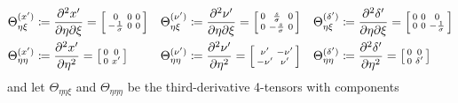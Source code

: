 \documentclass{article}
\begin{document}
\begin{align}
  \Theta_{\eta\xi}^{(x')}                                                                                                  & \coloneqq \frac{\partial^2 x'}{\partial \eta \partial \xi} = \begin{bsmallmatrix} 0 & 0 & 0 \\ -\frac{1}{\sigma} & 0 & 0 \end{bsmallmatrix} &   &
  \Theta_{\eta\xi}^{(\nu')} \coloneqq \frac{\partial^2 \nu'}{\partial \eta \partial \xi} = \begin{bsmallmatrix} 0 & \frac{s}{\sigma} & 0 \\ 0 & -\frac{s}{\sigma} & 0 \end{bsmallmatrix} &                                                                                              &
  \Theta_{\eta\xi}^{(\delta')} \coloneqq \frac{\partial^2 \delta'}{\partial \eta \partial \xi} = \begin{bsmallmatrix} 0 & 0 & 0 \\ 0 & 0 & -\frac{1}{\sigma} \end{bsmallmatrix}                                                                                                \\
  \Theta_{\eta\eta}^{(x')}                                                                                                 & \coloneqq \frac{\partial^2 x'}{\partial \eta^2} = \begin{bsmallmatrix} 0 & 0 \\ 0 & x' \end{bsmallmatrix}            &   &
  \Theta_{\eta\eta}^{(\nu')} \coloneqq \frac{\partial^2 \nu'}{\partial \eta^2} = \begin{bsmallmatrix} \nu' & -\nu' \\ -\nu' & \nu' \end{bsmallmatrix}           &                                                                                              &
  \Theta_{\eta\eta}^{(\delta')} \coloneqq \frac{\partial^2 \delta'}{\partial \eta^2} = \begin{bsmallmatrix} 0 & 0 \\ 0 & \delta' \end{bsmallmatrix}
\end{align}
%
and let $\Theta_{\eta\eta\xi}$ and $\Theta_{\eta\eta\eta}$ be the third-derivative 4-tensors with components
%
\end{document}
